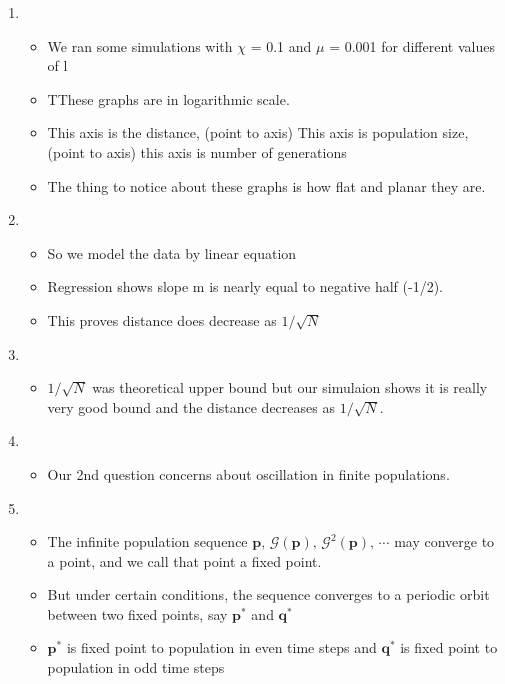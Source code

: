 \documentclass{article}
\begin{document}
\begin{enumerate}
\item
  \begin{itemize}
  \item We ran some simulations with $\chi$ = 0.1 and $\mu$ = 0.001 for
    different values of l
  \item TThese graphs are in logarithmic scale.
  \item  This axis is the distance, (point to axis) This axis is population size, (point to axis) this axis is number of generations
  \item The thing to notice about these graphs is how flat and planar they are. 
  \end{itemize}
    
\item
  \begin{itemize}
  \item So we model the data by linear equation
  \item Regression shows slope m is nearly equal to negative half (-1/2).
  \item This proves distance does decrease as $1/\sqrt{N}$  
  \end{itemize}

\item
  \begin{itemize}
  \item $1/\sqrt{N}$ was theoretical upper bound 
  but our simulaion shows it is really very good bound 
  and the distance decreases as $1/\sqrt{N}$. 
  \end{itemize}
    
\item 
  \begin{itemize}
  \item Our 2nd question concerns about oscillation in
    finite populations.
  \end{itemize}
    
\item
  \begin{itemize}
  \item The infinite population sequence  $\bm{p}, \, \mathcal{G}(\bm{p}), \, {\mathcal{G}}^2(\bm{p}), \, \cdots$ may
    converge to a point, and we call that point a fixed point.
  \item But under certain conditions, the sequence converges to a
    periodic orbit between two fixed points, say $\bm{p}^\ast$ and $\bm{q}^\ast$
    \item $\bm{p}^\ast$ is fixed point to population in even time steps and $\bm{q}^\ast$ is fixed point to population in odd time steps
\end{itemize}


\end{enumerate}
\end{document}
